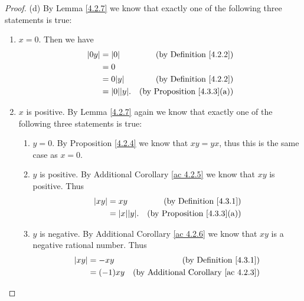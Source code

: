 \begin{proof}{(d)}
    By Lemma \ref{4.2.7} we know that exactly one of the following three statements is true:
    \begin{enumerate}[label=(\Roman*)]
        \item \(x = 0\).
              Then we have
              \begin{align*}
                  \abs*{0y} & = \abs*{0}           & \text{(by Definition \ref{4.2.2})}     \\
                            & = 0                                                           \\
                            & = 0 \abs*{y}         & \text{(by Definition \ref{4.2.2})}     \\
                            & = \abs*{0} \abs*{y}. & \text{(by Proposition \ref{4.3.3}(a))}
              \end{align*}
        \item \(x\) is positive.
              By Lemma \ref{4.2.7} again we know that exactly one of the following three statements is true:
              \begin{enumerate}[label=(\roman*)]
                  \item \(y = 0\).
                        By Proposition \ref{4.2.4} we know that \(xy = yx\), thus this is the same case as \(x = 0\).
                  \item \(y\) is positive.
                        By Additional Corollary \ref{ac 4.2.5} we know that \(xy\) is positive.
                        Thus
                        \begin{align*}
                            \abs*{xy} & = xy                 & \text{(by Definition \ref{4.3.1})}     \\
                                      & = \abs*{x} \abs*{y}. & \text{(by Proposition \ref{4.3.3}(a))}
                        \end{align*}
                  \item \(y\) is negative.
                        By Additional Corollary \ref{ac 4.2.6} we know that \(xy\) is a negative rational number.
                        Thus
                        \begin{align*}
                            \abs*{xy} & = -xy                & \text{(by Definition \ref{4.3.1})}              \\
                                      & = (-1)xy             & \text{(by Additional Corollary \ref{ac 4.2.3})} \\

\end{align*}
\end{enumerate}
\end{enumerate}
\end{proof}
